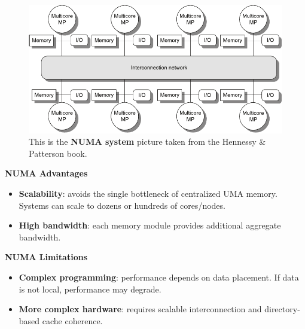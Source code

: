 \begin{itemize}
    \newpage

    \begin{figure}[!htp]
        \centering
        \includegraphics[width=\textwidth]{img/numa.pdf}
        \caption{This is the \textbf{NUMA system} picture taken from the Hennessy \& Patterson book.\cite{hennessy2017computer}}
    \end{figure}
    
    \textcolor{Green3}{ \textbf{NUMA Advantages}}
    \begin{itemize}
        \item[\textcolor{Green3}{\faIcon{check}}] \textcolor{Green3}{\textbf{Scalability}}: avoids the single bottleneck of centralized UMA memory. Systems can scale to dozens or hundreds of cores/nodes.
        \item[\textcolor{Green3}{\faIcon{check}}] \textcolor{Green3}{\textbf{High bandwidth}}: each memory module provides additional aggregate bandwidth.
    \end{itemize}
    \textcolor{Red2}{ \textbf{NUMA Limitations}}
    \begin{itemize}
        \item[\textcolor{Red2}{\faIcon{times}}] \textcolor{Red2}{\textbf{Complex programming}}: performance depends on data placement. If data is not local, performance may degrade.
        \item[\textcolor{Red2}{\faIcon{times}}] \textcolor{Red2}{\textbf{More complex hardware}}: requires scalable interconnection and directory-based cache coherence.
    \end{itemize}
\end{itemize}

